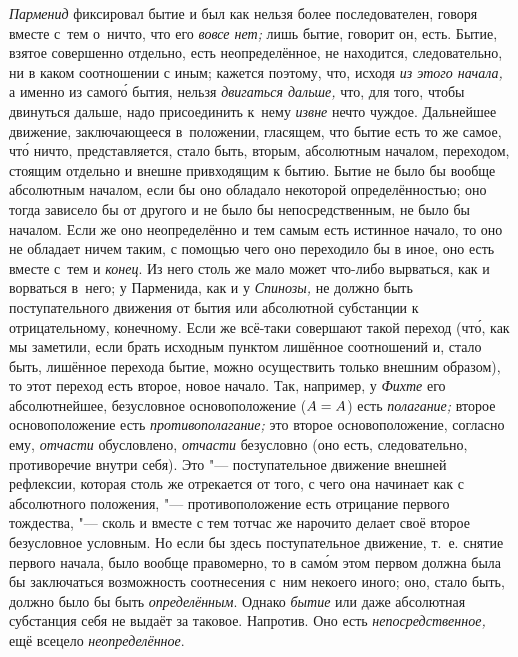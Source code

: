 {\em Парменид} фиксировал бытие и был как нельзя более последователен, говоря
вместе с~тем о~ничто, что его {\em вовсе нет;} лишь бытие, говорит он, есть.
Бытие, взятое совершенно отдельно, есть неопределённое, не находится,
следовательно, ни в каком соотношении с иным; кажется поэтому, что, исходя
{\em из этого начала,} а именно из самог\'{о} бытия,
нельзя {\em двигаться дальше,} что, для того,
чтобы двинуться дальше, надо присоединить к~нему {\em извне} нечто чуждое.
Дальнейшее движение, заключающееся в~положении, гласящем, что бытие есть то же
самое, чт\'{о} ничто, представляется, стало быть, вторым, абсолютным началом,
переходом, стоящим отдельно и внешне привходящим к бытию. Бытие не было бы
вообще абсолютным началом, если бы оно обладало некоторой определённостью; оно
тогда зависело бы от другого и не было бы непосредственным, не было бы началом.
Если же оно неопределённо и тем самым есть истинное начало, то оно не обладает
ничем таким, с помощью чего оно переходило бы в иное, оно есть вместе с~тем и
{\em конец}. Из него столь же мало может что-либо вырваться, как и ворваться
в~него; у Парменида, как и у {\em Спинозы,} не должно быть поступательного
движения от бытия или абсолютной субстанции к отрицательному, конечному. Если
же всё-таки совершают такой переход (чт\'{о}, как мы заметили, если брать
исходным пунктом лишённое соотношений и, стало быть, лишённое перехода бытие,
можно осуществить только внешним образом), то этот переход есть второе, новое
начало. Так, например, у {\em Фихте} его абсолютнейшее, безусловное
основоположение ($A\hm=A$) есть {\em полагание;} второе основоположение есть
{\em противополагание;} это второе основоположение, согласно ему, {\em отчасти}
обусловлено, {\em отчасти} безусловно (оно есть, следовательно, противоречие
внутри себя). Это "--- поступательное движение внешней рефлексии, которая столь
же отрекается от того, с чего она начинает как с абсолютного положения, "---
противоположение есть отрицание первого тождества, "--- сколь и вместе с тем
тотчас же нарочито делает своё второе безусловное условным. Но если бы здесь
поступательное движение, т.~е. снятие первого начала, было вообще правомерно,
то в сам\'{о}м этом первом должна была бы заключаться возможность соотнесения
с~ним некоего иного; оно, стало быть, должно было бы быть {\em определённым}.
Однако {\em бытие} или даже абсолютная субстанция себя не выдаёт за таковое.
Напротив. Оно есть {\em непосредственное,} ещё всецело {\em неопределённое}.

